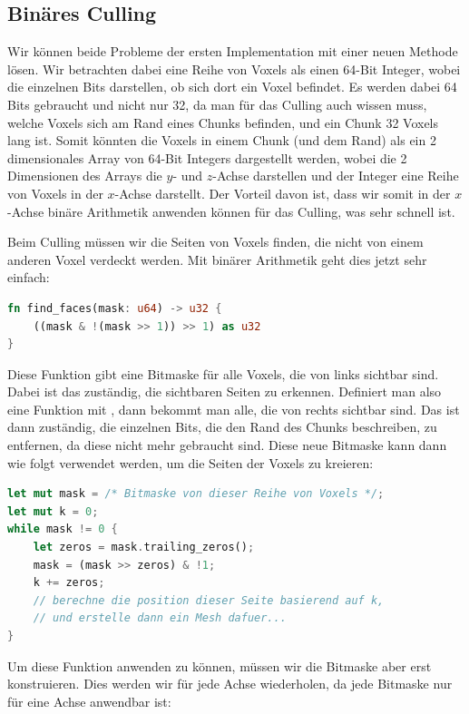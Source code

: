 \subsection{Binäres Culling}

Wir können beide Probleme der ersten Implementation
mit einer neuen Methode lösen.
Wir betrachten dabei eine Reihe von Voxels als einen
64-Bit Integer, wobei die einzelnen Bits darstellen,
ob sich dort ein Voxel befindet.
Es werden dabei 64 Bits gebraucht und nicht nur 32,
da man für das Culling auch wissen muss,
welche Voxels sich am Rand eines Chunks befinden,
und ein Chunk 32 Voxels lang ist.
Somit könnten die Voxels in einem Chunk
(und dem Rand) als ein 2 dimensionales
Array von 64-Bit Integers dargestellt werden,
wobei die 2 Dimensionen des Arrays die
$y$- und $z$-Achse darstellen und der Integer eine
Reihe von Voxels in der $x$-Achse darstellt.
Der Vorteil davon ist, dass wir somit in der
$x$-Achse binäre Arithmetik anwenden können für
das Culling, was sehr schnell ist.

Beim Culling müssen wir die Seiten von
Voxels finden, die nicht von einem anderen Voxel
verdeckt werden.
Mit binärer Arithmetik geht dies jetzt sehr einfach:

\begin{lstlisting}[language=Rust]
fn find_faces(mask: u64) -> u32 {
	((mask & !(mask >> 1)) >> 1) as u32
}
\end{lstlisting}
%
Diese Funktion gibt eine Bitmaske für alle Voxels,
die von links sichtbar sind.
Dabei ist das  zuständig,
die sichtbaren Seiten zu erkennen.
Definiert man also eine Funktion mit
, dann bekommt man alle,
die von rechts sichtbar sind.
Das  ist dann zuständig,
die einzelnen Bits, die den Rand des Chunks beschreiben,
zu entfernen, da diese nicht mehr gebraucht sind.
Diese neue Bitmaske kann dann wie folgt verwendet
werden, um die Seiten der Voxels zu kreieren:

\begin{lstlisting}[language=Rust]
let mut mask = /* Bitmaske von dieser Reihe von Voxels */;
let mut k = 0;
while mask != 0 {
	let zeros = mask.trailing_zeros();
	mask = (mask >> zeros) & !1;
	k += zeros;
	// berechne die position dieser Seite basierend auf k,
	// und erstelle dann ein Mesh dafuer...
}
\end{lstlisting}

Um diese Funktion anwenden zu können, müssen
wir die Bitmaske aber erst konstruieren.
Dies werden wir für jede Achse wiederholen,
da jede Bitmaske nur für eine Achse anwendbar ist:

